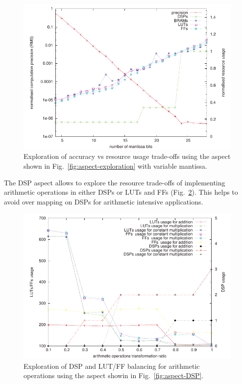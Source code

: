 \begin{figure}[!h]
\includegraphics[scale=0.7]{figs/pre}
\caption{Exploration of accuracy vs resource usage trade-offs using the aspect 
shown in Fig.~\ref{fig:aspect-exploration} with variable mantissa.}
\label{fig:precision}
  \vspace{-2mm}
\end{figure}

The DSP aspect allows to explore the resource trade-offs of
implementing arithmetic operations in either DSPs or LUTs and FFs
(Fig.~\ref{fig:arith}). This helps to avoid over mapping on DSPs for
arithmetic intensive applications.

\begin{figure}[!h]
\includegraphics[scale=0.7]{figs/arith}
\caption{Exploration of DSP and LUT/FF balancing for arithmetic
  operations using the aspect showin in Fig.~\ref{fig:aspect-DSP}.}
\label{fig:arith}
  \vspace{-2mm}
\end{figure}

